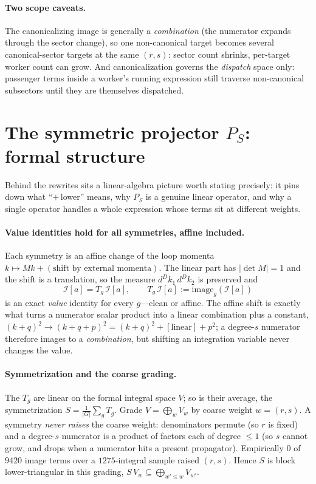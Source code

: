 \documentclass[11pt]{article}
\newcommand{\I}[1]{\mathcal{I}[#1]}
\begin{document}
\paragraph{Two scope caveats.} The canonicalizing image is generally a
\emph{combination} (the numerator expands through the sector change), so one
non-canonical target becomes several canonical-sector targets at the same $(r,s)$:
sector count shrinks, per-target worker count can grow. And canonicalization governs
the \emph{dispatch} space only: passenger terms inside a worker's running expression
still traverse non-canonical subsectors until they are themselves dispatched.

\section{The symmetric projector \texorpdfstring{$P_S$}{PS}: formal structure}
\label{sec:PS}
Behind the rewrites sits a linear-algebra picture worth stating precisely: it pins
down what ``$+\,$lower'' means, why $P_S$ is a genuine linear operator, and why a
single operator handles a whole expression whose terms sit at different weights.

\paragraph{Value identities hold for all symmetries, affine included.}
Each symmetry is an affine change of the loop momenta $k\mapsto Mk+(\text{shift by
external momenta})$. The linear part has $|\det M|=1$ and the shift is a translation,
so the measure $d^Dk_1\,d^Dk_2$ is preserved and
\begin{equation}
\I{a}=T_g\,\I{a},\qquad T_g\,\I{a}:=\mathrm{image}_g(\I{a})
\end{equation}
is an exact \emph{value} identity for every $g$---clean or affine. The affine shift is
exactly what turns a numerator scalar product into a linear combination plus a constant,
$(k{+}q)^2\to(k{+}q{+}p)^2=(k{+}q)^2+[\text{linear}]+p^2$; a degree-$s$ numerator
therefore images to a \emph{combination}, but shifting an integration variable never
changes the value.

\paragraph{Symmetrization and the coarse grading.}
The $T_g$ are linear on the formal integral space $V$; so is their average, the
symmetrization $S=\tfrac{1}{|G|}\sum_{g}T_g$. Grade $V=\bigoplus_w V_w$ by coarse
weight $w=(r,s)$. A symmetry \emph{never raises} the coarse weight: denominators
permute (so $r$ is fixed) and a degree-$s$ numerator is a product of factors each of
degree $\le1$ (so $s$ cannot grow, and drops when a numerator hits a present
propagator). Empirically $0$ of $9420$ image terms over a $1275$-integral sample raised
$(r,s)$. Hence $S$ is block lower-triangular in this grading,
$S\,V_w\subseteq\bigoplus_{w'\le w}V_{w'}$.
\end{document}
